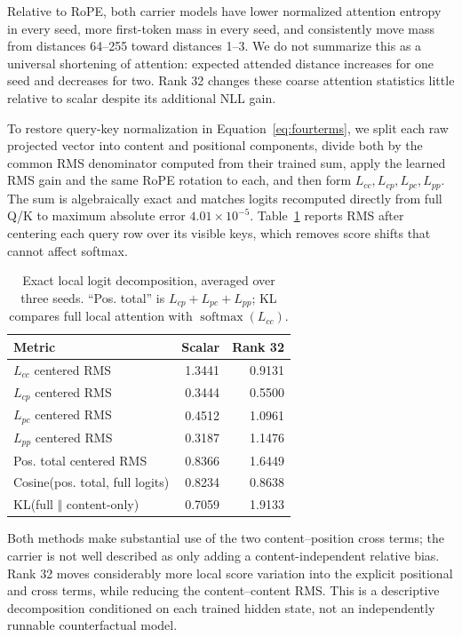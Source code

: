 \documentclass{article}
\begin{document}
Relative to RoPE, both carrier models have lower normalized attention entropy
in every seed, more first-token mass in every seed, and consistently move mass
from distances 64--255 toward distances 1--3. We do not summarize this as a
universal shortening of attention: expected attended distance increases for
one seed and decreases for two. Rank 32 changes these coarse attention
statistics little relative to scalar despite its additional NLL gain.

To restore query-key normalization in Equation~\ref{eq:fourterms}, we split
each raw projected vector into content and positional components, divide both
by the common RMS denominator computed from their trained sum, apply the
learned RMS gain and the same RoPE rotation to each, and then form
$L_{cc},L_{cp},L_{pc},L_{pp}$. The sum is algebraically exact and matches
logits recomputed directly from full Q/K to maximum absolute error
$4.01\times10^{-5}$. Table~\ref{tab:logitdecomposition} reports RMS after centering
each query row over its visible keys, which removes score shifts that cannot
affect softmax.

\begin{table}[t]
\centering
\caption{Exact local logit decomposition, averaged over three seeds. ``Pos.
total'' is $L_{cp}+L_{pc}+L_{pp}$; KL compares full local attention with
$\operatorname{softmax}(L_{cc})$.}
\label{tab:logitdecomposition}
\begin{tabular}{lrr}
\toprule
Metric & Scalar & Rank 32 \\
\midrule
$L_{cc}$ centered RMS & 1.3441 & 0.9131 \\
$L_{cp}$ centered RMS & 0.3444 & 0.5500 \\
$L_{pc}$ centered RMS & 0.4512 & 1.0961 \\
$L_{pp}$ centered RMS & 0.3187 & 1.1476 \\
Pos. total centered RMS & 0.8366 & 1.6449 \\
Cosine(pos. total, full logits) & 0.8234 & 0.8638 \\
KL(full $\Vert$ content-only) & 0.7059 & 1.9133 \\
\bottomrule
\end{tabular}
\end{table}

Both methods make substantial use of the two content--position cross terms;
the carrier is not well described as only adding a content-independent
relative bias. Rank 32 moves considerably more local score variation into the
explicit positional and cross terms, while reducing the content--content RMS.
This is a descriptive decomposition conditioned on each trained hidden state,
not an independently runnable counterfactual model.
\end{document}
